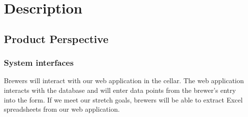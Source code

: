 \documentclass[draftclsnofoot,onecolumn,letterpaper,10pt,compsoc]{IEEEtran}
\begin{document}
\section{Description}
	\subsection{Product Perspective}
		\subsubsection{System interfaces}
			Brewers will interact with our web application in the cellar.
			The web application interacts with the database and will enter data points from the brewer's entry into the form.
			If we meet our stretch goals, brewers will be able to extract Excel spreadsheets from our web application.
\end{document}
